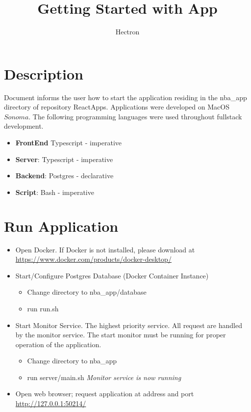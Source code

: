 \documentclass[a4paper,11pt]{article}
\author{Hectron}
\title{Getting Started with App}
\newcommand{\newpagex}{
    \newpage
    \vspace*{-7\baselineskip} %
}
\begin{document}
    \maketitle
    \tableofcontents
    \newpagex
    \noindent

    \section{Description}
        Document informs the user how to start the application residing in the nba\_app  directory of repository ReactApps. 
        Applications were developed on MacOS \(Sonoma\). The following programming languages were used throughout fullstack development.
        \begin{itemize}
            \item \textbf{FrontEnd} \newline \textmd{Typescript - imperative}
            \item \textbf{Server}: \newline  \textmd{Typescript - imperative}
            \item \textbf{Backend}: \newline  \textmd{Postgres - declarative}
            \item \textbf{Script}: \newline  \textmd{Bash - imperative}
        \end{itemize}

    \section{Run Application}
        \begin{itemize}
            \item  Open Docker. If Docker is not installed, please download at \hypersetup{colorlinks=false,urlcolor=black } \url{https://www.docker.com/products/docker-desktop/} 
            \item Start/Configure Postgres Database (Docker Container Instance) 
            \begin{itemize}
                \item Change directory to nba\_app/database
                \item run run.sh 
            \end{itemize}
            \item Start Monitor Service.
                \newline 
            The highest priority service. All request are handled by the monitor service. The start monitor must be running for proper operation of the application. 
                \begin{itemize}
                \item Change directory to nba\_app
                \item run server/main.sh \quad \small \textit{Monitor service is now running }
            \end{itemize}

            \item Open web browser; request application at address and port \url{ http://127.0.0.1:50214/ }
        \end{itemize}
            
\end{document}
